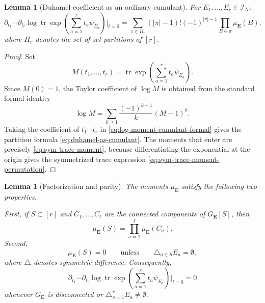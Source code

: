 \documentclass[11pt]{article}
\newtheorem{lemma}[theorem]{Lemma}
\newcommand{\tr}{\operatorname{tr}}
\newcommand{\calI}{\mathcal{I}}
\begin{document}
\begin{lemma}[Duhamel coefficient as an ordinary cumulant]
  \label{lem:duhamel-as-cumulant}
  For $E_1,\ldots,E_r\in\calI_N$,
  \begin{equation}\label{eq:duhamel-as-cumulant}
    \partial_{t_1}\cdots\partial_{t_r}
    \log\tr\exp\left(\sum_{a=1}^r t_a\psi_{E_a}\right)\bigg|_{t=0}
    =
    \sum_{\pi\in\Pi_r}
    (|\pi|-1)!(-1)^{|\pi|-1}
    \prod_{B\in\pi}\mu_{\mathbf E}(B),
  \end{equation}
  where $\Pi_r$ denotes the set of set partitions of $[r]$.
\end{lemma}

\begin{proof}
  Set
  \begin{equation}\label{eq:moment-generating-function}
    M(t_1,\ldots,t_r)
    =
    \tr\exp\left(\sum_{a=1}^r t_a\psi_{E_a}\right).
  \end{equation}
  Since $M(0)=1$, the Taylor coefficient of $\log M$ is obtained from the
  standard formal identity
  \begin{equation}\label{eq:log-moment-cumulant-formal}
    \log M
    =
    \sum_{k\geq1}\frac{(-1)^{k-1}}{k}(M-1)^k.
  \end{equation}
  Taking the coefficient of $t_1\cdots t_r$ in
  \eqref{eq:log-moment-cumulant-formal} gives the partition formula
  \eqref{eq:duhamel-as-cumulant}.  The moments that enter are precisely
  \eqref{eq:sym-trace-moment}, because differentiating the exponential at the
  origin gives the symmetrized trace expression
  \eqref{eq:sym-trace-moment-permutation}.
\end{proof}

\begin{lemma}[Factorization and parity]
  \label{lem:moment-factorization-parity}
  The moments $\mu_{\mathbf E}$ satisfy the following two properties.

  First, if $S\subset[r]$ and $C_1,\ldots,C_\ell$ are the connected components
  of $G_{\mathbf E}[S]$, then
  \begin{equation}\label{eq:moment-factorization-components}
    \mu_{\mathbf E}(S)
    =
    \prod_{a=1}^\ell \mu_{\mathbf E}(C_a).
  \end{equation}
  Second,
  \begin{equation}\label{eq:moment-parity-selection}
    \mu_{\mathbf E}(S)=0
    \qquad\text{unless}\qquad
    \triangle_{a\in S}E_a=\emptyset,
  \end{equation}
  where $\triangle$ denotes symmetric difference.
  Consequently,
  \begin{equation}\label{eq:duhamel-coeff-disconnected-or-odd-zero}
    \partial_{t_1}\cdots\partial_{t_r}
    \log\tr\exp\left(\sum_{a=1}^r t_a\psi_{E_a}\right)\bigg|_{t=0}=0
  \end{equation}
  whenever $G_{\mathbf E}$ is disconnected or
  $\triangle_{a=1}^rE_a\neq\emptyset$.
\end{lemma}
\end{document}
